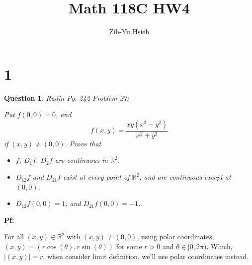 \documentclass{article}
\title{Math 118C HW4}
\author{Zih-Yu Hsieh}
\newtheorem{question}{Question}
\begin{document}
\maketitle

\section*{1}
\begin{myBox}[]{}
    \begin{question}
        Rudin Pg. 242 Problem 27:

        Put $f(0,0)=0$, and 
        $$f(x,y)=\frac{xy(x^2-y^2)}{x^2+y^2}$$
        if $(x,y)\neq (0,0)$. Prove that 
        \begin{itemize}
            \item[(a)] $f,\ D_1f,\ D_2f$ are continuous in $\mathbb{R}^2$.
            \item[(b)] $D_{12}f$ and $D_{21}f$ exist at every point of $\mathbb{R}^2$, and are continuous except at $(0,0)$.
            \item[(c)] $D_{12}f(0,0)=1$, and $D_{21}f(0,0)=-1$.  
        \end{itemize}
    \end{question}
\end{myBox}

\textbf{Pf:}

For all $(x,y)\in\mathbb{R}^2$ with $(x,y)\neq (0,0)$, using polar coordinates, $(x,y)=(r\cos(\theta),r\sin(\theta))$ for some $r>0$ and $\theta\in [0,2\pi)$. Which, $|(x,y)|=r$, when consider limit definition, we'll use polar coordinates instead.
\end{document}
